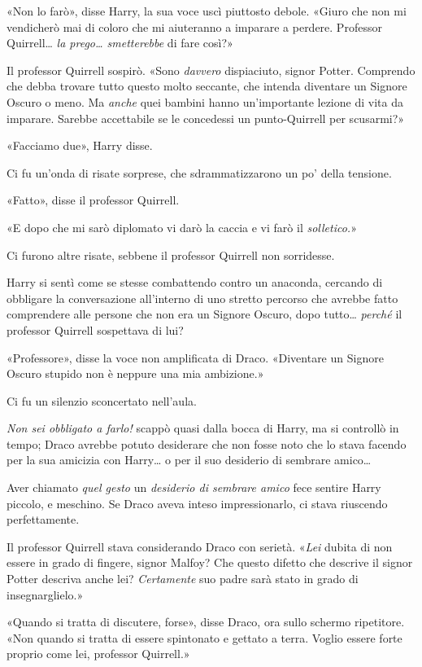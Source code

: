 «Non lo farò», disse Harry, la sua voce uscì piuttosto debole. «Giuro che non mi vendicherò mai di coloro che mi aiuteranno a imparare a perdere. Professor Quirrell… \textit{la prego… smetterebbe} di fare così?»

Il professor Quirrell sospirò. «Sono \textit{davvero} dispiaciuto, signor Potter. Comprendo che debba trovare tutto questo molto seccante, che intenda diventare un Signore Oscuro o meno. Ma \textit{anche} quei bambini hanno un’importante lezione di vita da imparare. Sarebbe accettabile se le concedessi un punto-Quirrell per scusarmi?»

«Facciamo due», Harry disse.

Ci fu un’onda di risate sorprese, che sdrammatizzarono un po’ della tensione.

«Fatto», disse il professor Quirrell.

«E dopo che mi sarò diplomato vi darò la caccia e vi farò il \textit{solletico.}»

Ci furono altre risate, sebbene il professor Quirrell non sorridesse.

Harry si sentì come se stesse combattendo contro un anaconda, cercando di obbligare la conversazione all’interno di uno stretto percorso che avrebbe fatto comprendere alle persone che non era un Signore Oscuro, dopo tutto… \textit{perché} il professor Quirrell sospettava di lui?

«Professore», disse la voce non amplificata di Draco. «Diventare un Signore Oscuro stupido non è neppure una mia ambizione.»

Ci fu un silenzio sconcertato nell’aula.

\textit{Non sei obbligato a farlo!} scappò quasi dalla bocca di Harry, ma si controllò in tempo; Draco avrebbe potuto desiderare che non fosse noto che lo stava facendo per la sua amicizia con Harry… o per il suo desiderio di sembrare amico…

Aver chiamato \textit{quel gesto} un \textit{desiderio di sembrare amico} fece sentire Harry piccolo, e meschino. Se Draco aveva inteso impressionarlo, ci stava riuscendo perfettamente.

Il professor Quirrell stava considerando Draco con serietà. «\textit{Lei} dubita di non essere in grado di fingere, signor Malfoy? Che questo difetto che descrive il signor Potter descriva anche lei? \textit{Certamente} suo padre sarà stato in grado di insegnarglielo.»

«Quando si tratta di discutere, forse», disse Draco, ora sullo schermo ripetitore. «Non quando si tratta di essere spintonato e gettato a terra. Voglio essere forte proprio come lei, professor Quirrell.»

